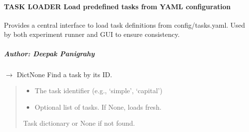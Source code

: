 \documentclass[letterpaper,10pt,english]{sphinxmanual}
\begin{document}
\paragraph{TASK LOADER \textendash{} Load predefined tasks from YAML configuration}
\label{\detokenize{core.utils:task-loader-load-predefined-tasks-from-yaml-configuration}}\begin{description}
\sphinxAtStartPar
Provides a central interface to load task definitions from config/tasks.yaml.
Used by both experiment runner and GUI to ensure consistency.

\end{description}


\subparagraph{Author: Deepak Panigrahy}
\label{\detokenize{core.utils:author-deepak-panigrahy}}

\begin{fulllineitems}
\label{\detokenize{core.utils:core.utils.get_task_by_id}}
\pysigstartsignatures
\pysiglinewithargsret
{}
{\sphinxparamcomma {}}
{{ $\rightarrow$ DictNone}}
\pysigstopsignatures
\sphinxAtStartPar
Find a task by its ID.
\begin{quote}\begin{description}
\begin{itemize}
\item {} 
\sphinxAtStartPar
{} \textendash{} The task identifier (e.g., ‘simple’, ‘capital’)

\item {} 
\sphinxAtStartPar
{} \textendash{} Optional list of tasks. If None, loads fresh.

\end{itemize}

\sphinxAtStartPar
Task dictionary or None if not found.

\end{description}\end{quote}

\end{fulllineitems}
\end{document}
